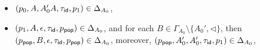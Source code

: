 \begin{itemize}
\begin{itemize}
\begin{itemize}
                    \begin{itemize}
                        \item $(p_0,A,A_0'A,\tau_{\mathsf{id}},p_1)\in\Delta_{A_0}$,
                        \item $(p_1, A,\epsilon,\tau_{\mathsf{id}},p_{\mathsf{pop}})\in\Delta_{A_0}$, and for each $B\in\Gamma_{A_0}\setminus\{A_0',\triangleleft\}$, then $(p_{\mathsf{pop}},B,\epsilon,\tau_{\mathsf{id}},p_{\mathsf{pop}})\in\Delta_{A_0}$, moreover, $(p_{\mathsf{pop}},A_0',A_0',\tau_{\mathsf{id}},p_1)\in\Delta_{A_0}$, 
                    \end{itemize}
                \end{itemize}
            \end{itemize}
    \end{itemize}
